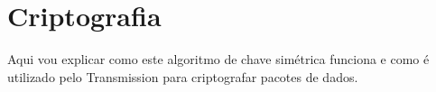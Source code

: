 
\section{Criptografia}

Aqui vou explicar como este algoritmo de chave simétrica funciona e como é utilizado
pelo Transmission para criptografar pacotes de dados.